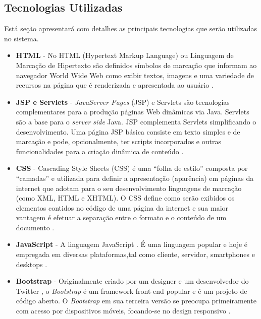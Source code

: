 \documentclass[a4paper,12pt]{monografia}
\begin{document}

\subsection{Tecnologias Utilizadas} %
\label{sub:tecnologias_ultilizadas}

Está seção apresentará com detalhes as principais tecnologias que serão utilizadas no sistema.

\begin{itemize}
\item \textbf{HTML} - No HTML (Hypertext Markup Language) ou Linguagem de Marcação de Hipertexto são definidos símbolos de marcação que informam ao navegador World Wide Web como exibir textos, imagens e uma variedade de recursos na página que é renderizada e apresentada ao usuário \cite{html}.

\item \textbf{JSP e Servlets} - \textit{JavaServer Pages} (JSP) e Servlets são tecnologias complementares para a produção páginas Web dinâmicas via Java. Servlets são a base para o \textit{server side} Java. JSP complementa Servlets  simplificando o desenvolvimento. Uma página JSP básica consiste em texto simples e de marcação e pode, opcionalmente, ter scripts incorporados e outras funcionalidades para a criação dinâmica de conteúdo \cite{jsp2007java}.

\item \textbf{CSS} - Cascading Style Sheets (CSS) é uma “folha de estilo” composta por “camadas” e utilizada para definir a apresentação (aparência) em páginas da internet que adotam para o seu desenvolvimento linguagens de marcação (como XML, HTML e XHTML). O CSS define como serão exibidos os elementos contidos no código de uma página da internet e sua maior vantagem é efetuar a separação entre o formato e o conteúdo de um documento \cite{anapereira}.

\item \textbf{JavaScript} - A linguagem JavaScript \cite{goodman}. É uma linguagem popular e hoje é empregada em diversas plataformas,tal como cliente, servidor, smartphones e desktops \cite{stefanov}.

\item \textbf{Bootstrap} - Originalmente criado por um designer e um desenvolvedor do Twitter \citeyear{twitter}, o \textit{Bootstrap} é um framework front-end popular e é um projeto de código aberto. O \textit{Bootstrap} em sua terceira versão se preocupa primeiramente com acesso por dispositivos móveis, focando-se no design responsivo \cite{bootstrap}.


\end{itemize}
\end{document}
